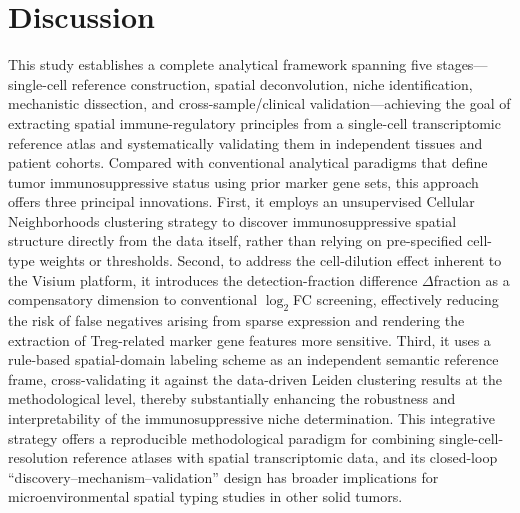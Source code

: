 \documentclass[12pt, a4paper]{article}
\begin{document}
\section{Discussion}

This study establishes a complete analytical framework spanning five stages—single-cell reference construction, spatial deconvolution, niche identification, mechanistic dissection, and cross-sample/clinical validation—achieving the goal of extracting spatial immune-regulatory principles from a single-cell transcriptomic reference atlas and systematically validating them in independent tissues and patient cohorts. Compared with conventional analytical paradigms that define tumor immunosuppressive status using prior marker gene sets, this approach offers three principal innovations. First, it employs an unsupervised Cellular Neighborhoods clustering strategy to discover immunosuppressive spatial structure directly from the data itself, rather than relying on pre-specified cell-type weights or thresholds. Second, to address the cell-dilution effect inherent to the Visium platform, it introduces the detection-fraction difference $\Delta$fraction as a compensatory dimension to conventional $\log_2$FC screening, effectively reducing the risk of false negatives arising from sparse expression and rendering the extraction of Treg-related marker gene features more sensitive. Third, it uses a rule-based spatial-domain labeling scheme as an independent semantic reference frame, cross-validating it against the data-driven Leiden clustering results at the methodological level, thereby substantially enhancing the robustness and interpretability of the immunosuppressive niche determination. This integrative strategy offers a reproducible methodological paradigm for combining single-cell-resolution reference atlases with spatial transcriptomic data, and its closed-loop ``discovery--mechanism--validation'' design has broader implications for microenvironmental spatial typing studies in other solid tumors.
\end{document}
